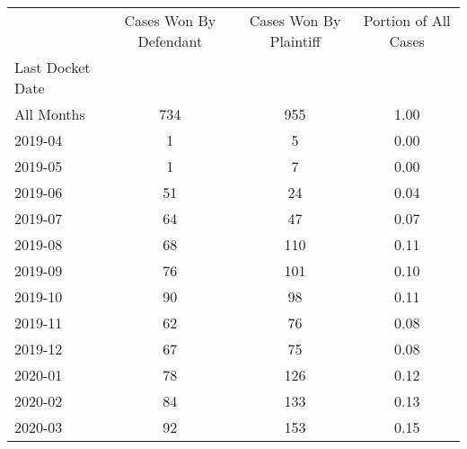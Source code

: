 \begin{tabular}{lccc}
\toprule
 & Cases Won By Defendant & Cases Won By Plaintiff & Portion of All Cases \\
Last Docket Date &  &  &  \\
\midrule
All Months & 734 & 955 & 1.00 \\
2019-04 & 1 & 5 & 0.00 \\
2019-05 & 1 & 7 & 0.00 \\
2019-06 & 51 & 24 & 0.04 \\
2019-07 & 64 & 47 & 0.07 \\
2019-08 & 68 & 110 & 0.11 \\
2019-09 & 76 & 101 & 0.10 \\
2019-10 & 90 & 98 & 0.11 \\
2019-11 & 62 & 76 & 0.08 \\
2019-12 & 67 & 75 & 0.08 \\
2020-01 & 78 & 126 & 0.12 \\
2020-02 & 84 & 133 & 0.13 \\
2020-03 & 92 & 153 & 0.15 \\
\bottomrule
\end{tabular}

